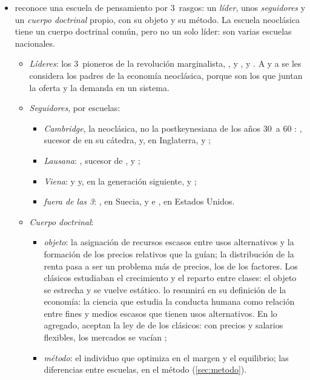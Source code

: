 \documentclass[11pt]{article}
\begin{document}
\begin{itemize}
\item {} reconoce una escuela de pensamiento por 3~rasgos: un \emph{líder}, unos \emph{seguidores} y un \emph{cuerpo doctrinal} propio, con su objeto y su método\nocite{Schumpeter1954History}. La escuela neoclásica tiene un cuerpo doctrinal común, pero no un solo líder: son varias escuelas nacionales.
  \begin{itemize}
  \item \emph{Líderes}: los 3~pioneros de la revolución marginalista, ,  y , y . A  y a  se les considera los padres de la economía neoclásica, porque son los que juntan la oferta y la demanda en un sistema.
  \item \emph{Seguidores}, por escuelas:
    \begin{itemize}
    \item \emph{Cambridge}, la neoclásica, no la postkeynesiana de los años 30~a 60 : , sucesor de  en su cátedra, y, en Inglaterra,  y ;
    \item \emph{Lausana}: , sucesor de , y ;
    \item \emph{Viena}:  y  y, en la generación siguiente,  y ;
    \item \emph{fuera de las 3}: , en Suecia, y  e , en Estados Unidos.
    \end{itemize}
  \item \emph{Cuerpo doctrinal}:
    \begin{itemize}
    \item \emph{objeto}: la asignación de recursos escasos entre usos alternativos y la formación de los precios relativos que la guían; la distribución de la renta pasa a ser un problema más de precios, los de los factores. Los clásicos estudiaban el crecimiento y el reparto entre clases: el objeto se estrecha y se vuelve estático. \textcite{Robbins1932Essay} lo resumirá en su definición de la economía: la ciencia que estudia la conducta humana como relación entre fines y medios escasos que tienen usos alternativos. En lo agregado, aceptan la ley de  de los clásicos: con precios y salarios flexibles, los mercados se vacían ;
    \item \emph{método}: el individuo que optimiza en el margen y el equilibrio; las diferencias entre escuelas, en el método (\ref{sec:metodo}).
    \end{itemize}
  \end{itemize}
\end{itemize}
\end{document}
